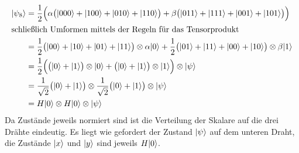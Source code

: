\begin{align*}
        | \psi_8 \rangle &= \frac{1}{2} \Big(\alpha\big(| 000 \rangle + | 100 \rangle + | 010 \rangle + | 110 \rangle\big) + \beta\big(| 011 \rangle + | 111 \rangle + | 001 \rangle + | 101 \rangle\big)\Big) \\
        \intertext{schließlich Umformen mittels der Regeln für das Tensorprodukt}
                      &= \frac{1}{2} \big(| 00 \rangle + | 10 \rangle + | 01 \rangle + | 11 \rangle\big) \otimes \alpha| 0 \rangle + \frac{1}{2} \big(| 01 \rangle + | 11 \rangle + | 00 \rangle + | 10 \rangle\big) \otimes \beta | 1 \rangle \\
                      &= \frac{1}{2} \Big(\big(| 0 \rangle + | 1 \rangle\big) \otimes | 0 \rangle + \big(| 0 \rangle + | 1 \rangle\big) \otimes | 1 \rangle\Big) \otimes | \psi \rangle \\
                      &= \frac{1}{\sqrt{2}} \big(| 0 \rangle + | 1 \rangle\big) \otimes \frac{1}{\sqrt{2}} \big(| 0 \rangle + | 1 \rangle\big) \otimes | \psi \rangle \\
                      &= H | 0 \rangle \otimes H | 0 \rangle \otimes | \psi \rangle
\end{align*}
Da Zustände jeweils normiert sind ist die Verteilung der Skalare auf
die drei Drähte eindeutig. Es liegt wie gefordert der Zustand $| \psi \rangle$ auf
dem unteren Draht, die Zustände $| x \rangle$ und $| y \rangle$ sind jeweils
$H| 0 \rangle$.
